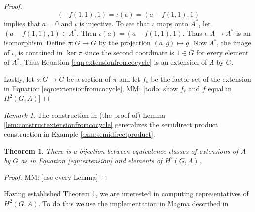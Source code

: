 \documentclass{dcthesis}
\newcommand{\mm}[1]{{\color{blue} \sf MM: [#1]}}
\newcommand{\wt}[1]{\widetilde{#1}}
\renewcommand{\ker}{\operatorname{ker}}
\numberwithin{equation}{section}
\newtheorem{theorem}[equation]{Theorem}
\theoremstyle{definition}
\theoremstyle{remark}
\newtheorem{remark}[equation]{Remark}
\begin{document}
{{\begin{proof}
\begin{equation}
        (-f(1,1),1) =\iota(a)
                    =(a-f(1,1),1)
      \end{equation}
      implies that $a=0$
      and $\iota$ is injective.
      To see that $\iota$ maps onto $A^*$,
      let $(a-f(1,1),1)\in A^*$.
      Then $\iota(a)=(a-f(1,1),1)$.
      Thus $\iota\colon A\to A^*$ is an isomorphism.
      Define $\pi\colon\wt{G}\to G$ by
      the projection
      $(a,g)\mapsto g$.
      Now $A^*$, the image of $\iota$,
      is contained in $\ker\pi$
      since the second coordinate is $1\in G$
      for every element of $A^*$.
      Thus
      Equation
      \ref{eqn:extensionfromcocycle}
      is an extension of $A$ by $G$.
      \par
      Lastly,
      let $s\colon G\to\wt{G}$
      be a section of $\pi$
      and let $f_s$ be the factor set
      of the extension in
      Equation
      \ref{eqn:extensionfromcocycle}.
      \mm{todo: show $f_s$ and $f$ equal in $H^2(G,A)$}
    \end{proof}
    \begin{remark}
      \label{rmk:semidirectproducttrivialcocycle}
      The construction in (the proof of)
      Lemma \ref{lem:constructextensionfromcocycle}
      generalizes the semidirect product construction
      in Example \ref{exm:semidirectproduct}.
    \end{remark}
    \begin{theorem}
      \label{thm:dfthm36}
      There is a bijection between equivalence
      classes of extensions of $A$ by $G$
      as in Equation
      \ref{eqn:extension}
      and
      elements of $H^2(G,A)$.
    \end{theorem}
    \begin{proof}
      \mm{use every Lemma}
    \end{proof}
    Having established Theorem \ref{thm:dfthm36},
    we are interested in computing representatives
    of $H^2(G,A)$.
    To do this
    we use the implementation
    in \textsf{Magma} described in
}}
\end{document}
